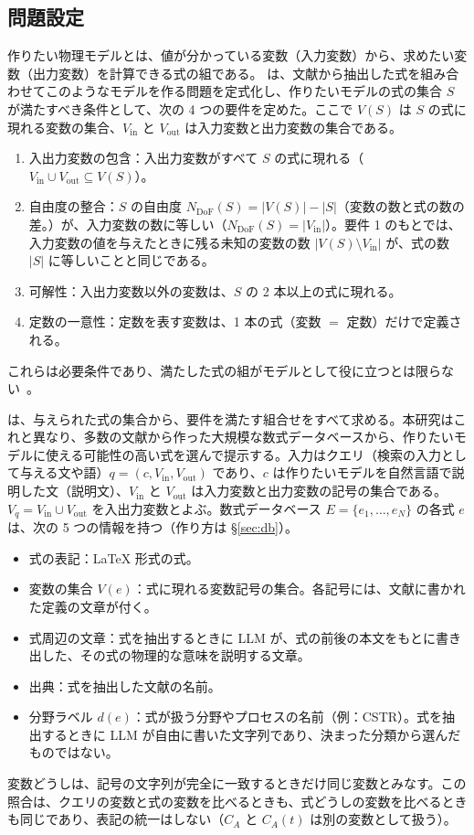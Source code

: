 \documentclass[a4j,dvipdfmx,11pt]{jresume}
\newcommand{\Vin}{V_{\mathrm{in}}}
\newcommand{\Vout}{V_{\mathrm{out}}}
\newcommand{\Ndof}{N_{\mathrm{DoF}}}
\begin{document}
\subsection{問題設定}\label{sec:problem}
作りたい物理モデルとは、値が分かっている変数（入力変数）から、求めたい変数（出力変数）を計算できる式の組である。\citet{CombineEq} は、文献から抽出した式を組み合わせてこのようなモデルを作る問題を定式化し、作りたいモデルの式の集合 $S$ が満たすべき条件として、次の 4 つの要件を定めた。ここで $V(S)$ は $S$ の式に現れる変数の集合、$\Vin$ と $\Vout$ は入力変数と出力変数の集合である。
\begin{enumerate}[leftmargin=2.2em]
  \item 入出力変数の包含：入出力変数がすべて $S$ の式に現れる（$\Vin \cup \Vout \subseteq V(S)$）。
  \item 自由度の整合：$S$ の自由度 $\Ndof(S) = |V(S)| - |S|$（変数の数と式の数の差。\citealp{Seborg}）が、入力変数の数に等しい（$\Ndof(S) = |\Vin|$）。要件 1 のもとでは、入力変数の値を与えたときに残る未知の変数の数 $|V(S) \setminus \Vin|$ が、式の数 $|S|$ に等しいことと同じである。
  \item 可解性：入出力変数以外の変数は、$S$ の 2 本以上の式に現れる。
  \item 定数の一意性：定数を表す変数は、1 本の式（変数 $=$ 定数）だけで定義される。
\end{enumerate}
これらは必要条件であり、満たした式の組がモデルとして役に立つとは限らない~\citep{CombineEq}。

\citet{CombineEq} は、与えられた式の集合から、要件を満たす組合せをすべて求める。本研究はこれと異なり、多数の文献から作った大規模な数式データベースから、作りたいモデルに使える可能性の高い式を選んで提示する。入力はクエリ（検索の入力として与える文や語）$q = (c, \Vin, \Vout)$ であり、$c$ は作りたいモデルを自然言語で説明した文（説明文）、$\Vin$ と $\Vout$ は入力変数と出力変数の記号の集合である。$V_q = \Vin \cup \Vout$ を入出力変数とよぶ。数式データベース $E = \{e_1, \dots, e_N\}$ の各式 $e$ は、次の 5 つの情報を持つ（作り方は \S\ref{sec:db}）。
\begin{itemize}[leftmargin=1.5em]
  \item 式の表記：\LaTeX{} 形式の式。
  \item 変数の集合 $V(e)$：式に現れる変数記号の集合。各記号には、文献に書かれた定義の文章が付く。
  \item 式周辺の文章：式を抽出するときに LLM が、式の前後の本文をもとに書き出した、その式の物理的な意味を説明する文章。
  \item 出典：式を抽出した文献の名前。
  \item 分野ラベル $d(e)$：式が扱う分野やプロセスの名前（例：CSTR）。式を抽出するときに LLM が自由に書いた文字列であり、決まった分類から選んだものではない。
\end{itemize}
変数どうしは、記号の文字列が完全に一致するときだけ同じ変数とみなす。この照合は、クエリの変数と式の変数を比べるときも、式どうしの変数を比べるときも同じであり、表記の統一はしない（$C_A$ と $C_A(t)$ は別の変数として扱う）。
\end{document}
